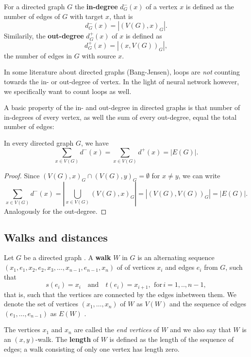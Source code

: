 \begin{remark} 
For a directed graph $G$ the \textbf{in-degree} $d^-_G(x)$ of a vertex $x$ is defined as the number of edges of $G$ with target $x$, that is
\[
d^-_G(x) = \left|(V(G),x)_G\right|.
\]
Similarily, the \textbf{out-degree} $d^+_G(x)$ of $x$ is defined as
\[
d^+_G(x) = \left|(x, V(G))_G\right|,
\]
the number of edges in $G$ with source $x$.
\end{remark}

\begin{remark}[Side]
In some literature about directed graphs (Bang-Jensen), loops are \textit{not} counting towards the in- or out-degree of vertex. In the light of neural network however, we specifically want to count loops as well.
\end{remark} 

A basic property of the in- and out-degree in directed graphs is  that number of in-degrees of every vertex, as well the sum of every out-degree, equal the total number of edges: 

\begin{proposition}
In every directed graph $G$, we have
\[
\sum_{x \in V(G)} d^-(x) = \sum_{x \in V(G)} d^+(x) = | E(G) |.
\]
\end{proposition}

\begin{proof}
Since $(V(G),x)_G \cap (V(G),y)_G = \emptyset$ for $x \ne y$, we can write
\[
\sum_{x \in V(G)} d^-(x) = \left| \bigcup_{x \in V(G)} (V(G),x)_G \right| = \left| (V(G),V(G))_G \right| = | E(G) |.
\]
Analogously for the out-degree.
\end{proof}	 


\subsection*{Walks and distances}

Let $G$ be a directed graph . A \textbf{walk} $W$ in $G$ is an alternating sequence $(x_1,e_1,x_2,e_2,x_3,\ldots,x_{n-1},e_{n-1},x_n)$ of of vertices $x_i$ and edges $e_i$ from $G$, such that 
\[
s(e_i) = x_i \quad \mathrm{and} \quad t(e_i) = x_{i+1}, \:\, \mathrm{for}\, i=1,..,n-1, 
\]
that is, such that the vertices are connected by the edges inbetween them. We denote the set of vertices $(x_1,\ldots,x_n)$ of $W$ as $V(W)$ and the sequence of edges $(e_1,\dots,e_{n-1})$ as $E(W)$ . 

The vertices $x_1$ and $x_n$ are called the \textit{end vertices} of $W$ and we also say that $W$ is an $(x,y)$-walk. The \textbf{length} of $W$ is defined as the length of the sequence of edges; a walk consisting of only one vertex has length zero.  


